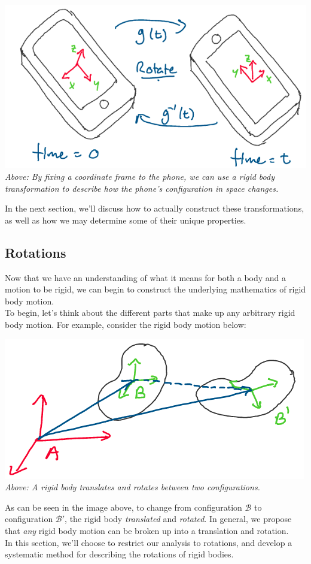 \documentclass[oneside]{book}
\begin{document}
\begin{center}
    \includegraphics[scale=0.4]{images/gframe.png}\\
    \textit{Above: By fixing a coordinate frame to the phone, we can use a rigid body transformation to describe how the phone's configuration in space changes.}
\end{center}
In the next section, we'll discuss how to actually construct these transformations, as well as how we may determine some of their unique properties.

\subsection{Rotations}
Now that we have an understanding of what it means for both a body and a motion to be rigid, we can begin to construct the underlying mathematics of rigid body motion.\\
To begin, let's think about the different parts that make up any arbitrary rigid body motion. For example, consider the rigid body motion below:
\begin{center}
    \includegraphics[scale=0.4]{images/rigidmotion.png}\\
    \textit{Above: A rigid body translates and rotates between two configurations.}
\end{center}
As can be seen in the image above, to change from configuration $\mathcal{B}$ to configuration $\mathcal{B}'$, the rigid body \textit{translated} and \textit{rotated}. In general, we propose that \textit{any} rigid body motion can be broken up into a translation and rotation.\\
In this section, we'll choose to restrict our analysis to rotations, and develop a systematic method for describing the rotations of rigid bodies.
\end{document}
